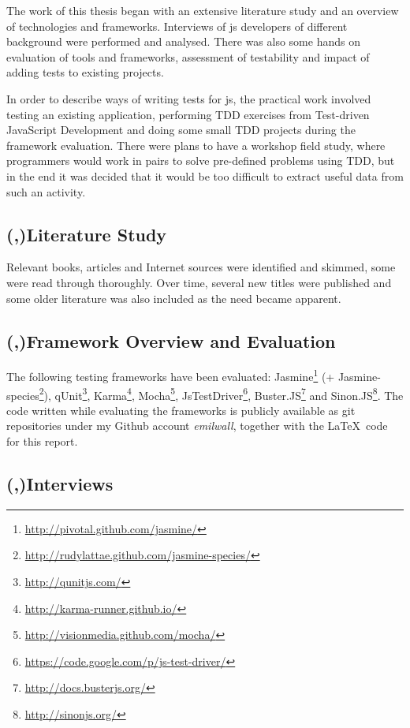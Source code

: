 \documentclass[11pt]{article}
\begin{document}
The work of this thesis began with an extensive literature study and an overview of technologies and frameworks. Interviews of \gls{js} developers of different background were performed and analysed. There was also some hands on evaluation of tools and frameworks, assessment of testability and impact of adding tests to existing projects.

In order to describe ways of writing tests for \gls{js}, the practical work involved testing an existing application, performing TDD exercises from Test-driven JavaScript Development \cite{Tddjs} and doing some small TDD projects during the framework evaluation. There were plans to have a workshop field study, where programmers would work in pairs to solve pre-defined problems using TDD, but in the end it was decided that it would be too difficult to extract useful data from such an activity.

\subsection{(,)Literature Study}

Relevant books, articles and Internet sources were identified and skimmed, some were read through thoroughly. Over time, several new titles were published and some older literature was also included as the need became apparent.

\subsection{(,)Framework Overview and Evaluation}

The following testing frameworks have been evaluated:
Jasmine\footnote{\url{http://pivotal.github.com/jasmine/}} (+ Jasmine-species\footnote{\url{http://rudylattae.github.com/jasmine-species/}}),
qUnit\footnote{\url{http://qunitjs.com/}},
Karma\footnote{\url{http://karma-runner.github.io/}},
Mocha\footnote{\url{http://visionmedia.github.com/mocha/}},
JsTestDriver\footnote{\url{https://code.google.com/p/js-test-driver/}},
Buster.JS\footnote{\url{http://docs.busterjs.org/}} and
Sinon.JS\footnote{\url{http://sinonjs.org/}}. The code written while evaluating the frameworks is publicly available as git repositories under my Github account \emph{emilwall}, together with the \LaTeX~code for this report.

\subsection{(,)Interviews}
\end{document}
